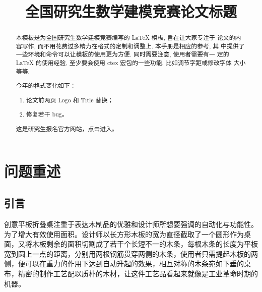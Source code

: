 \documentclass[bwprint]{gmcmthesis}
\title{全国研究生数学建模竞赛论文标题}
\begin{document}
\maketitle

\begin{abstract}
本模板是为全国研究生数学建模竞赛编写的 \LaTeX{} 模板, 旨在让大家专注于
论文的内容写作, 而不用花费过多精力在格式的定制和调整上. 本手册是相应的参考, 其
中提供了一些环境和命令可以让模板的使用更为方便. 同时需要注意, 使用者需要有一
定的 \LaTeX{} 的使用经验, 至少要会使用 ctex 宏包的一些功能, 比如调节字距或修改字体
大小等等.

\begin{mdframed}[%
roundcorner=5pt,linecolor=gray!50,outerlinewidth=0.5pt,
middlelinewidth=0.3pt,backgroundcolor=gray!2,
innertopmargin=\topskip, frametitle={2026年格式变化说明},
frametitlefont= \bfseries,frametitlerule=true,frametitlealignment =\raggedright\noindent,
frametitlerulewidth=.5pt, frametitlebackgroundcolor=gray!2,]
今年的格式变化如下：
\begin{enumerate}
\item 论文前两页 Logo 和 Title 替换；
\item 修复若干 bug。
\end{enumerate}
\end{mdframed}

这是研究生报名官方网站，点击\href{https://cpipc.acge.org.cn/}{}进入。



\end{abstract}

\pagestyle{plain}

\maketoc

\clearpage

\section{问题重述}

\subsection{引言}   %

创意平板折叠桌注重于表达木制品的优雅和设计师所想要强调的自动化与功能性。为了增大有效使用面积。设计师以长方形木板的宽为直径截取了一个圆形作为桌面，又将木板剩余的面积切割成了若干个长短不一的木条，每根木条的长度为平板宽到圆上一点的距离，分别用两根钢筋贯穿两侧的木条，使用者只需提起木板的两侧，便可以在重力的作用下达到自动升起的效果，相互对称的木条宛如下垂的桌布，精密的制作工艺配以质朴的木材，让这件工艺品看起来就像是工业革命时期的机器。
\end{document}
